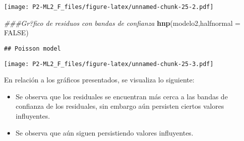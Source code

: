 \documentclass[]{article}
\newenvironment{Shaded}{\begin{snugshade}}{\end{snugshade}}
\newcommand{\CommentTok}[1]{\textcolor[rgb]{0.56,0.35,0.01}{\textit{#1}}}
\newcommand{\DataTypeTok}[1]{\textcolor[rgb]{0.13,0.29,0.53}{#1}}
\newcommand{\KeywordTok}[1]{\textcolor[rgb]{0.13,0.29,0.53}{\textbf{#1}}}
\newcommand{\NormalTok}[1]{#1}
\newcommand{\OtherTok}[1]{\textcolor[rgb]{0.56,0.35,0.01}{#1}}
\providecommand{\tightlist}{%
  \setlength{\itemsep}{0pt}\setlength{\parskip}{0pt}}
\begin{document}
\texttt{[image: P2-ML2\_F\_files/figure-latex/unnamed-chunk-25-2.pdf]}

\begin{Shaded}
\begin{Highlighting}[]
\CommentTok{\#\#\#Gr?fico de residuos con bandas de confianza}
\KeywordTok{hnp}\NormalTok{(modelo2,}\DataTypeTok{halfnormal =} \OtherTok{FALSE}\NormalTok{)}
\end{Highlighting}
\end{Shaded}

\begin{verbatim}
## Poisson model
\end{verbatim}

\texttt{[image: P2-ML2\_F\_files/figure-latex/unnamed-chunk-25-3.pdf]}

En relación a los gráficos presentados, se visualiza lo siguiente:

\begin{itemize}
\tightlist
\item
  Se observa que los residuales se encuentran más cerca a las bandas de
  confianza de los residuales, sin embargo aún persisten ciertos valores
  influyentes.
\item
  Se observa que aún siguen persistiendo valores influyentes.
\end{itemize}
\end{document}
